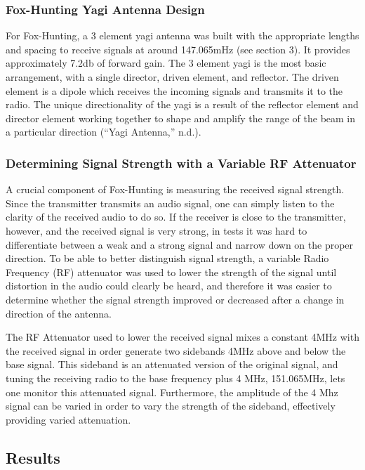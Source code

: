 \documentclass[12pt,]{article}
\begin{document}
\subsubsection{Fox-Hunting Yagi Antenna
Design}\label{fox-hunting-yagi-antenna-design}

For Fox-Hunting, a 3 element yagi antenna was built with the appropriate
lengths and spacing to receive signals at around 147.065mHz (see section
3). It provides approximately 7.2db of forward gain. The 3 element yagi
is the most basic arrangement, with a single director, driven element,
and reflector. The driven element is a dipole which receives the
incoming signals and transmits it to the radio. The unique
directionality of the yagi is a result of the reflector element and
director element working together to shape and amplify the range of the
beam in a particular direction (``Yagi Antenna,'' n.d.).

\subsubsection{Determining Signal Strength with a Variable RF
Attenuator}\label{determining-signal-strength-with-a-variable-rf-attenuator}

A crucial component of Fox-Hunting is measuring the received signal
strength. Since the transmitter transmits an audio signal, one can
simply listen to the clarity of the received audio to do so. If the
receiver is close to the transmitter, however, and the received signal
is very strong, in tests it was hard to differentiate between a weak and
a strong signal and narrow down on the proper direction. To be able to
better distinguish signal strength, a variable Radio Frequency (RF)
attenuator was used to lower the strength of the signal until distortion
in the audio could clearly be heard, and therefore it was easier to
determine whether the signal strength improved or decreased after a
change in direction of the antenna.

The RF Attenuator used to lower the received signal mixes a constant
4MHz with the received signal in order generate two sidebands 4MHz above
and below the base signal. This sideband is an attenuated version of the
original signal, and tuning the receiving radio to the base frequency
plus 4 MHz, 151.065MHz, lets one monitor this attenuated signal.
Furthermore, the amplitude of the 4 Mhz signal can be varied in order to
vary the strength of the sideband, effectively providing varied
attenuation.

\subsection{Results}\label{results}
\end{document}
